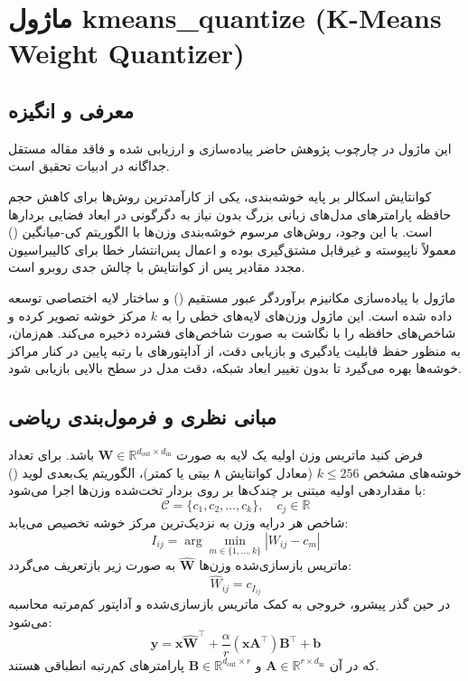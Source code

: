 \section{ماژول kmeans\_quantize (K-Means Weight Quantizer)}
\label{sec:module_kmeans_quantize}

\subsection{معرفی و انگیزه}
این ماژول در چارچوب پژوهش حاضر پیاده‌سازی و ارزیابی شده و فاقد مقاله مستقل جداگانه در ادبیات تحقیق است.

کوانتایش اسکالر بر پایه خوشه‌بندی، یکی از کارآمدترین روش‌ها برای کاهش حجم حافظه پارامترهای مدل‌های زبانی بزرگ بدون نیاز به دگرگونی در ابعاد فضایی بردارها است. با این وجود، روش‌های مرسوم خوشه‌بندی وزن‌ها با الگوریتم کی-میانگین () معمولاً ناپیوسته و غیرقابل مشتق‌گیری بوده و اعمال پس‌انتشار خطا برای کالیبراسیون مجدد مقادیر پس از کوانتایش با چالش جدی روبرو است.

ماژول  با پیاده‌سازی مکانیزم برآوردگر عبور مستقیم () و ساختار لایه اختصاصی  توسعه داده شده است. این ماژول وزن‌های لایه‌های خطی را به $k$ مرکز خوشه تصویر کرده و شاخص‌های حافظه را با نگاشت به صورت شاخص‌های فشرده ذخیره می‌کند. هم‌زمان، به منظور حفظ قابلیت یادگیری و بازیابی دقت، از آداپتورهای با رتبه پایین  در کنار مراکز خوشه‌ها بهره می‌گیرد تا بدون تغییر ابعاد شبکه، دقت مدل در سطح بالایی بازیابی شود.

\subsection{مبانی نظری و فرمول‌بندی ریاضی}
فرض کنید ماتریس وزن اولیه یک لایه به صورت $\mathbf{W} \in \mathbb{R}^{d_{\text{out}} \times d_{\text{in}}}$ باشد. برای تعداد خوشه‌های مشخص $k \le 256$ (معادل کوانتایش ۸ بیتی یا کمتر)، الگوریتم یک‌بعدی لوید () با مقداردهی اولیه مبتنی بر چندک‌ها بر روی بردار تخت‌شده وزن‌ها اجرا می‌شود:
\begin{equation}
\mathcal{C} = \{c_1, c_2, \dots, c_k\}, \quad c_j \in \mathbb{R}
\end{equation}
شاخص هر درایه وزن به نزدیک‌ترین مرکز خوشه تخصیص می‌یابد:
\begin{equation}
I_{ij} = \arg\min_{m \in \{1, \dots, k\}} |W_{ij} - c_m|
\end{equation}
ماتریس بازسازی‌شده وزن‌ها $\mathbf{\hat{W}}$ به صورت زیر بازتعریف می‌گردد:
\begin{equation}
\hat{W}_{ij} = c_{I_{ij}}
\end{equation}
در حین گذر پیشرو، خروجی به کمک ماتریس بازسازی‌شده و آداپتور کم‌مرتبه  محاسبه می‌شود:
\begin{equation}
\mathbf{y} = \mathbf{x} \mathbf{\hat{W}}^\top + \frac{\alpha}{r} (\mathbf{x} \mathbf{A}^\top) \mathbf{B}^\top + \mathbf{b}
\end{equation}
که در آن $\mathbf{A} \in \mathbb{R}^{r \times d_{\text{in}}}$ و $\mathbf{B} \in \mathbb{R}^{d_{\text{out}} \times r}$ پارامترهای کم‌رتبه انطباقی هستند.


